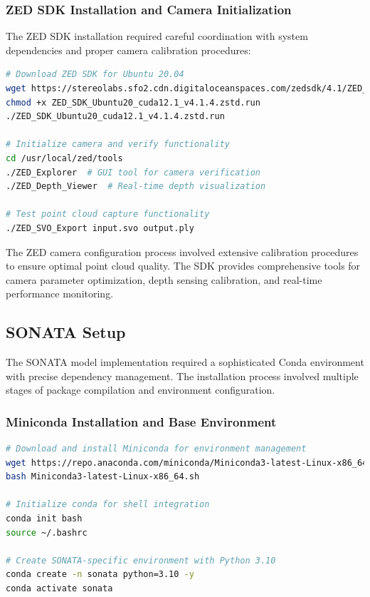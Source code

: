 \documentclass[12pt,a4paper]{report}
\begin{document}
\subsubsection{ZED SDK Installation and Camera Initialization}

The ZED SDK installation required careful coordination with system dependencies and proper camera calibration procedures:

\begin{lstlisting}[caption=ZED SDK Installation and Camera Setup, label=lst:zed_installation, language=bash]
# Download ZED SDK for Ubuntu 20.04
wget https://stereolabs.sfo2.cdn.digitaloceanspaces.com/zedsdk/4.1/ZED_SDK_Ubuntu20_cuda12.1_v4.1.4.zstd.run
chmod +x ZED_SDK_Ubuntu20_cuda12.1_v4.1.4.zstd.run
./ZED_SDK_Ubuntu20_cuda12.1_v4.1.4.zstd.run

# Initialize camera and verify functionality
cd /usr/local/zed/tools
./ZED_Explorer  # GUI tool for camera verification
./ZED_Depth_Viewer  # Real-time depth visualization

# Test point cloud capture functionality
./ZED_SVO_Export input.svo output.ply
\end{lstlisting}

The ZED camera configuration process involved extensive calibration procedures to ensure optimal point cloud quality. The SDK provides comprehensive tools for camera parameter optimization, depth sensing calibration, and real-time performance monitoring.

\subsection{SONATA Setup}

The SONATA model implementation required a sophisticated Conda environment with precise dependency management. The installation process involved multiple stages of package compilation and environment configuration.

\subsubsection{Miniconda Installation and Base Environment}

\begin{lstlisting}[caption=Miniconda Installation for SONATA Environment, label=lst:miniconda_setup, language=bash]
# Download and install Miniconda for environment management
wget https://repo.anaconda.com/miniconda/Miniconda3-latest-Linux-x86_64.sh
bash Miniconda3-latest-Linux-x86_64.sh

# Initialize conda for shell integration
conda init bash
source ~/.bashrc

# Create SONATA-specific environment with Python 3.10
conda create -n sonata python=3.10 -y
conda activate sonata
\end{lstlisting}
\end{document}
